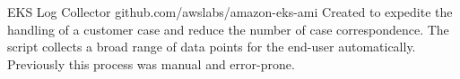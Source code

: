 \projectitem
    {EKS Log Collector}
    {github.com/awslabs/amazon-eks-ami}
    {Created to expedite the handling of a customer case and reduce the number of case correspondence. The script collects a broad range of data points for the end-user automatically. Previously this process  was manual and error-prone.}
